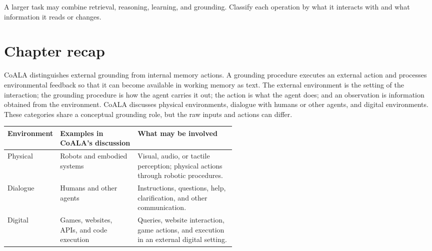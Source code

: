 A larger task may combine retrieval, reasoning, learning, and grounding. Classify each operation by what it interacts with and what information it reads or changes.

\section{Chapter recap}
\label{sec:grounding-recap}

\begin{chapterrecap}
CoALA distinguishes external grounding from internal memory actions. A grounding procedure executes an external action and processes environmental feedback so that it can become available in working memory as text. The external environment is the setting of the interaction; the grounding procedure is how the agent carries it out; the action is what the agent does; and an observation is information obtained from the environment. CoALA discusses physical environments, dialogue with humans or other agents, and digital environments. These categories share a conceptual grounding role, but the raw inputs and actions can differ.
\end{chapterrecap}

\begin{center}
\begin{tabularx}{\linewidth}{@{}P{0.19\linewidth}P{0.34\linewidth}X@{}}
\toprule
\textbf{Environment} & \textbf{Examples in CoALA's discussion} & \textbf{What may be involved} \\
\midrule
Physical & Robots and embodied systems & Visual, audio, or tactile perception; physical actions through robotic procedures. \\
Dialogue & Humans and other agents & Instructions, questions, help, clarification, and other communication. \\
Digital & Games, websites, APIs, and code execution & Queries, website interaction, game actions, and execution in an external digital setting. \\
\bottomrule
\end{tabularx}
\end{center}

